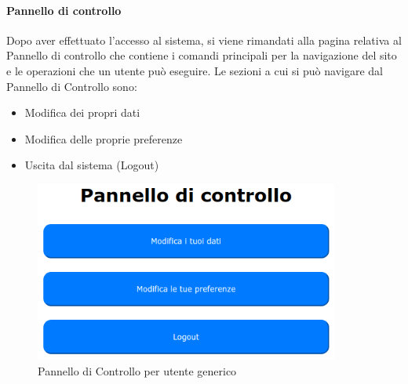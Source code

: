 \paragraph{Pannello di controllo}
Dopo aver effettuato l'accesso al sistema, si viene rimandati alla pagina relativa al Pannello di controllo che contiene i comandi principali per la navigazione del sito e le operazioni che un utente può eseguire.
Le sezioni a cui si può navigare dal Pannello di Controllo sono:
\begin{itemize}
	\item Modifica dei propri dati
	\item Modifica delle proprie preferenze
	\item Uscita dal sistema (Logout)
\end{itemize}
\begin{figure}[H]
	\centering
	\includegraphics[width=10cm]{img/user_panel_1.png}
	\caption{Pannello di Controllo per utente generico}
\end{figure}

